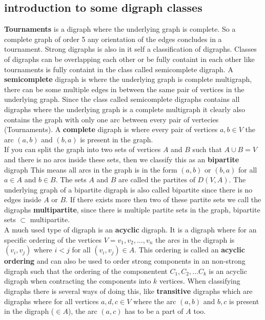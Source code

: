 \subsection{introduction to some digraph classes}
\textbf{Tournaments} is a digraph where the underlying graph is complete. 
So a complete graph of order 5 any orientation of the edges concludes in a tournament.
Strong digraphs is also in it self a classification of digraphs. Classes of digraphs can be overlapping each other or be fully containt in each other like tournaments is fully containt in the class called semicomplete digraph.
A \textbf{semicomplete} digraph is where the underlying graph is complete multigraph, there can be some multiple edges in between the same pair of vertices in the underlying graph. Since the class called semicomplete digraphs contains all digraphs where the underlying graph is a complete multigraph it clearly also contains the graph with only one arc between every pair of vertecies (Tournaments).
A \textbf{complete} digraph is where every pair of vertices $a,b\in V$ the arc $(a,b)$ and $(b,a)$ is present in the graph. \\
If you can split the graph into two sets of vertices $A$ and $B$ such that $A\cup B=V$ and there is no arcs inside these sets, then we classify this as an \textbf{bipartite} digraph This means all arcs in the graph is in the form $(a,b)$ or $(b,a)$ for all $a\in A$ and $b\in B$. 
The sets $A$ and $B$ are called the partites of $D(V,A)$. 
The underlying graph of a bipartite digraph is also called bipartite since there is no edges inside $A$ or $B$.
If there exists more then two of these partite sets we call the digraphs \textbf{multipartite}, since there is multiple partite sets in the graph, bipartite sets $\subset$ multipartite. \\
A much used type of digraph is an \textbf{acyclic} digraph. 
It is a digraph where for an specific ordering of the vertices $V={v_1, v_2,\dots , v_n}$ the arcs in the digraph is $(v_i, v_j)$ where $i<j$ for all $(v_i, v_j)\in A$. This ordering is called an \textbf{acyclic ordering} and can also be used to order strong components in an non-strong digraph such that the ordering of the componentent $C_1,C_2,\dots C_k$ is an acyclic digraph when contracting the components into $k$ vertices. 
When classifying digraphs there is several ways of doing this, like \textbf{transitive} digraphs which are digraphs where for all vertices $a,d,c\in V$ where the arc $(a,b)$ and $b,c$ is present in the digraph ($\in A$), the arc $(a,c)$ has to be a part of $A$ too. 
